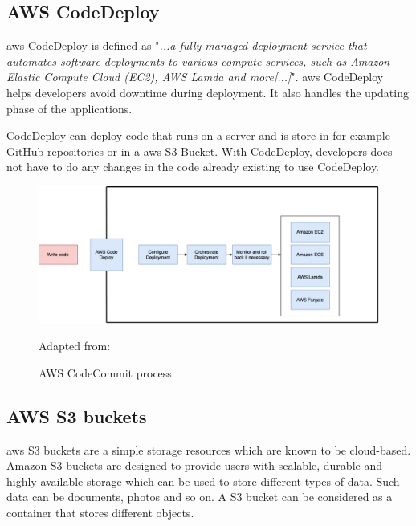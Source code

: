 \newpage
\subsection{AWS CodeDeploy}
\acrshort{aws} CodeDeploy is defined as "\textit{...a fully managed deployment service that automates software deployments to various compute services, such as Amazon Elastic Compute Cloud (EC2), AWS Lamda and more[...]}"\cite{AWSCodeDeploy}.
\acrshort{aws} CodeDeploy helps developers avoid downtime during deployment. It also handles the updating phase of the applications. 

CodeDeploy can deploy code that runs on a server and is store in for example GitHub repositories or in a \acrshort{aws} S3 Bucket. With CodeDeploy, developers does not have to do any changes in the code already existing to use CodeDeploy. \cite{CodeDeploy1}

\begin{figure}[htp]
    \centering
    \includegraphics[width=1\columnwidth]{Images/AWSCodeDeploy.png}
    \caption{AWS CodeCommit process} Adapted from: \cite{CodeDeploy1}
    \label{fig:my_label}
\end{figure}

\newpage

\subsection{AWS S3 buckets}
\acrshort{aws} S3 buckets are a simple storage resources which are known to be  cloud-based. Amazon S3 buckets are designed to provide users with scalable, durable and highly available storage which can be used to store different types of data. Such data can be documents, photos and so on. A S3 bucket can be considered as a container that stores different objects. \cite{S3Bucket}